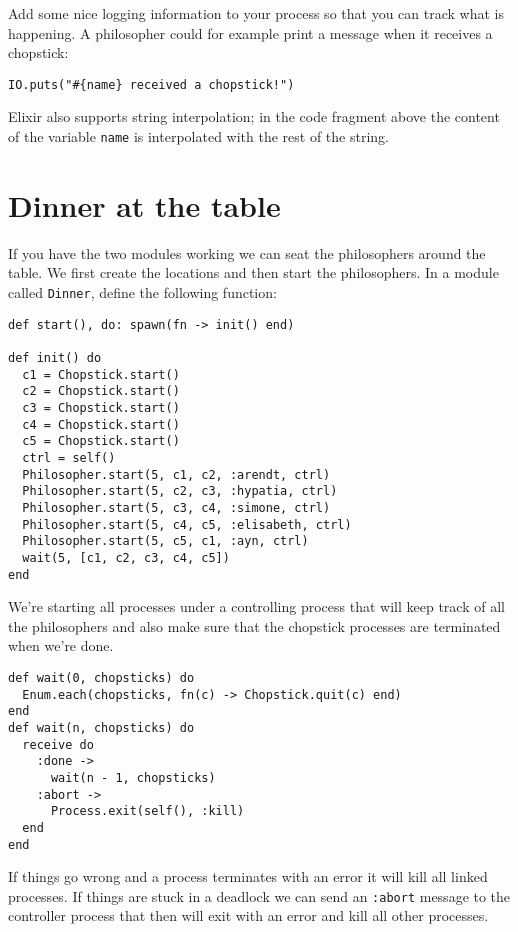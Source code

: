 \documentclass[a4paper,11pt]{article}
\begin{document}
Add some nice logging information to your process so that you can
track what is happening. A philosopher could for example print a
message when it receives a chopstick:

\begin{verbatim}
IO.puts("#{name} received a chopstick!")
\end{verbatim}

Elixir also supports string interpolation; in the code fragment above
the content of the variable {\tt name} is interpolated with the rest
of the string.



\section{Dinner at the table}

If you have the two modules working we can seat the philosophers
around the table. We first create the locations and then start the
philosophers. In a module called {\tt Dinner}, define the following
function:

\begin{verbatim}
def start(), do: spawn(fn -> init() end)

def init() do
  c1 = Chopstick.start()    
  c2 = Chopstick.start()
  c3 = Chopstick.start()
  c4 = Chopstick.start()
  c5 = Chopstick.start()
  ctrl = self()
  Philosopher.start(5, c1, c2, :arendt, ctrl)
  Philosopher.start(5, c2, c3, :hypatia, ctrl)
  Philosopher.start(5, c3, c4, :simone, ctrl)
  Philosopher.start(5, c4, c5, :elisabeth, ctrl)
  Philosopher.start(5, c5, c1, :ayn, ctrl)
  wait(5, [c1, c2, c3, c4, c5])
end
\end{verbatim}

We're starting all processes under a controlling process that will keep
track of all the philosophers and also make sure that the chopstick
processes are terminated when we're done.

\begin{verbatim}
def wait(0, chopsticks) do
  Enum.each(chopsticks, fn(c) -> Chopstick.quit(c) end)
end
def wait(n, chopsticks) do
  receive do
    :done ->
      wait(n - 1, chopsticks)
    :abort ->
      Process.exit(self(), :kill)
  end
end
\end{verbatim}

If things go wrong and a process terminates with an error it will kill
all linked processes. If things are stuck in a deadlock we can send
an {\tt :abort} message to the controller process that then will exit
with an error and kill all other processes.
\end{document}
